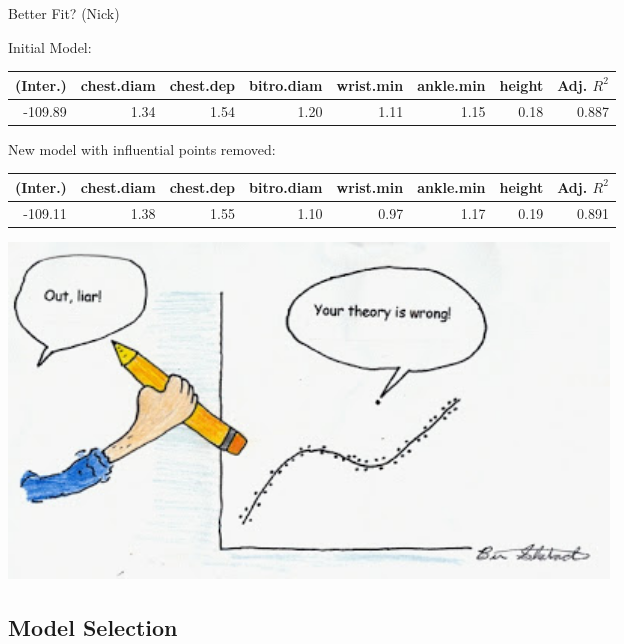 \documentclass[table]{beamer}\usepackage[]{graphicx}\usepackage[]{color}
\begin{document}

\begin{frame} {Better Fit? (Nick)} 

Initial Model: \\

{\fontsize{0.275cm}{1em}\selectfont 
\begin{tabular}{|r|r|r|r|r|r|r|r|}
\hline
    (Inter.) & chest.diam & chest.dep & bitro.diam & wrist.min & ankle.min & height & Adj. $R^2$ \\ \hline
   -109.89 & 1.34  & 1.54 & 1.20  & 1.11 & 1.15 & 0.18 & 0.887 \\ \hline
   
\end{tabular}
}



New model with influential points removed:\\

{\fontsize{0.275cm}{1em}\selectfont 
\begin{tabular}{|r|r|r|r|r|r|r|r|}
\hline
    (Inter.) & chest.diam & chest.dep & bitro.diam & wrist.min & ankle.min & height & Adj. $R^2$ \\ \hline
   -109.11 & 1.38  & 1.55 & 1.10  & 0.97 & 1.17 & 0.19 & 0.891 \\ \hline

\end{tabular}

}

\begin{center}
\includegraphics[width=0.7\textwidth]{outlier}
\end{center}

\end{frame}


\subsection{Model Selection}
\end{document}
